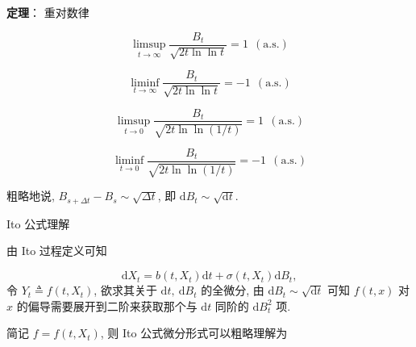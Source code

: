 \documentclass[openany]{ctexbook}
\theoremstyle{kaiti}
\theoremstyle{normal}
\begin{document}
\textbf{定理}： 重对数律

\begin{equation}
  \limsup_{t\to\infty}\frac{B_t}{\sqrt{2t\ln\ln t}}=1~~(\text{a.s.})
\end{equation}

\begin{equation}
  \liminf_{t\to\infty}\frac{B_t}{\sqrt{2t\ln\ln t}}=-1~~(\text{a.s.})
\end{equation}

\begin{equation}
  \limsup_{t\to0}\frac{B_t}{\sqrt{2t\ln\ln (1/t)}}=1~~(\text{a.s.})
\end{equation}

\begin{equation}
  \liminf_{t\to0}\frac{B_t}{\sqrt{2t\ln\ln (1/t)}}=-1~~(\text{a.s.})
\end{equation}

粗略地说, $B_{s+\Delta t}-B_s\sim\sqrt{\Delta t}$, 即 $\mathrm{d}B_t\sim\sqrt{\mathrm{d}t}$.

Ito 公式理解

由 Ito 过程定义可知

\begin{equation}
  \mathrm{d}X_t=b(t,X_t)\mathrm{d}t+\sigma(t,X_t)\mathrm{d}B_t,
\end{equation}
令 $Y_t\triangleq f(t,X_t)$, 欲求其关于 $\mathrm{d}t,~\mathrm{d}B_t$ 的全微分, 由 $\mathrm{d}B_t\sim\sqrt{\mathrm{d}t}$ 可知 $f(t,x)$ 对 $x$ 的偏导需要展开到二阶来获取那个与 $\mathrm{d}t$ 同阶的 $\mathrm{d}B_t^2$ 项.

简记 $f=f(t,X_t)$, 则 Ito 公式微分形式可以粗略理解为
\end{document}
